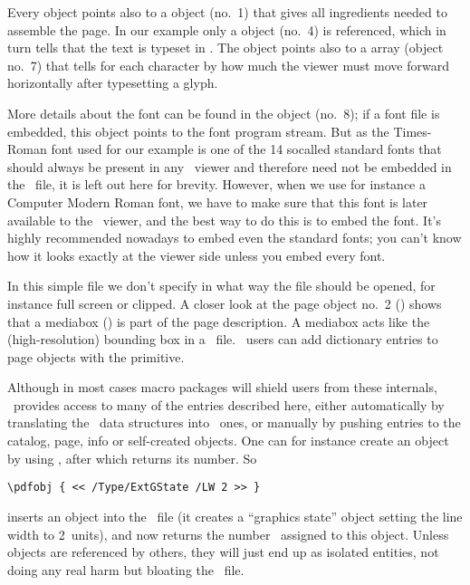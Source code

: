 \documentclass{pdftexmanual}
\begin{document}
Every  object points also to a  object
(no.~1) that gives all ingredients needed to assemble the page. In our
example only a  object (no.~4) is referenced, which in turn
tells that the text is typeset in  . The
 object points also to a  array (object no.~7)
that tells for each character by how much the viewer must move forward
horizontally after typesetting a glyph.

More details about the font can be found in the 
object (no.~8); if a font file is embedded, this object points to the
font program stream. But as the Times-Roman font used for our example is
one of the 14 so\hyph called standard fonts that should always be present in
any \PDF\ viewer and therefore need not be embedded in the \PDF\ file,
it is left out here for brevity. However, when we use for instance a
Computer Modern Roman font, we have to make sure that this font is later
available to the \PDF\ viewer, and the best way to do this is to embed
the font. It's highly recommended nowadays to embed even the standard
fonts; you can't know how it looks exactly at the viewer side unless you
embed every font.

In this simple file we don't specify in what way the file should be
opened, for instance full screen or clipped. A closer look at the page
object no.~2 () shows that a mediabox
() is part of the page description. A mediabox acts like
the (high-resolution) bounding box in a \POSTSCRIPT\ file. \PDFTEX\
users can add dictionary entries to page objects with the
 primitive.

Although in most cases macro packages will shield users from these
internals, \PDFTEX\ provides access to many of the entries described
here, either automatically by translating the \TEX\ data structures into
\PDF\ ones, or manually by pushing entries to the catalog, page, info or
self-created objects. One can for instance create an object by using
\cs{pdfobj}, after which \cs{pdflastobj} returns its number. So

\begin{verbatim}
\pdfobj { << /Type/ExtGState /LW 2 >> }
\end{verbatim}

\noindent inserts an object into the \PDF\ file (it creates a ``graphics
state'' object setting the line width to 2~units), and \cs{pdflastobj}
now returns the number \PDFTEX\ assigned to this object. Unless objects
are referenced by others, they will just end up as isolated entities,
not doing any real harm but bloating the \PDF\ file.
\end{document}
